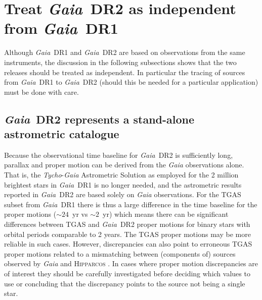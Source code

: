 \documentclass[longauth]{aa_gaia} %
\newcommand\gaia{\textit{Gaia}}
\newcommand\gdr[1]{\gaia~DR#1}
\newcommand\hip{\textsc{Hipparcos}}
\newcommand\tyc{\textit{Tycho}}
\begin{document}
%
%

\section{Treat \gdr{2} as independent from \gdr{1}}
\label{sec:dr2vsdr1}

Although \gdr{1} and \gdr{2} are based on observations from the same instruments, the discussion
in the following subsections shows that the two releases should be treated as independent. In
particular the tracing of sources from \gdr{1} to \gdr{2} (should this be needed for a
particular application) must be done with care.

\subsection{\gdr{2} represents a stand-alone astrometric catalogue}

Because the observational time baseline for \gdr{2} is sufficiently long, parallax and proper
motion can be derived from the {\gaia} observations alone. That is, the {\tyc}-{\gaia} Astrometric
Solution \citep[TGAS,][]{2015A&A...574A.115M} as employed for the 2 million brightest stars in
\gdr{1} is no longer needed, and the astrometric results reported in \gdr{2} are based solely on
{\gaia} observations. For the TGAS subset from \gdr{1} there is thus a large difference in the
time baseline for the proper motions ($\sim24$~yr vs $\sim 2$~yr) which means there can be significant
differences between TGAS and \gdr{2} proper motions for binary stars with orbital periods
comparable to 2 years. The TGAS proper motions may be more reliable in such cases. However,
discrepancies can also point to erroneous TGAS proper motions related to a mismatching between
(components of) sources observed by {\gaia} and {\hip} \citep[see][for a discussion of this
issue]{2017ApJ...840L...1M}. In cases where proper motion discrepancies are of interest they should
be carefully investigated before deciding which values to use or concluding that the discrepancy
points to the source not being a single star.
\end{document}
